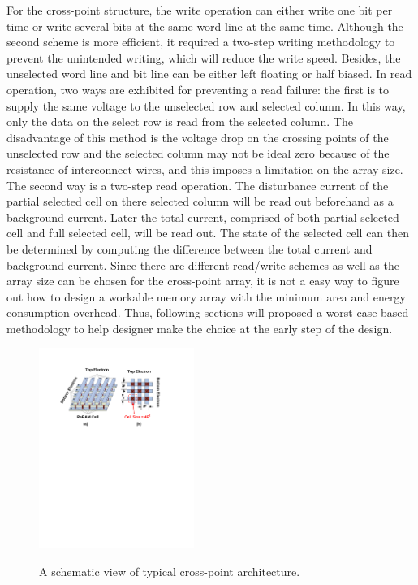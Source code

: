 For the cross-point structure, the write operation can either write one bit per time or write several bits at the same word line at the same time. Although the second scheme is more efficient, it required a two-step writing methodology to prevent the unintended writing, which will reduce the write speed. Besides, the unselected word line and bit line can be either left floating or half biased. In read operation, two ways are exhibited for preventing a read failure: the first is to supply the same voltage to the unselected row and selected column. In this way, only the data on the select row is read from the selected column. The disadvantage of this method is the voltage drop on the crossing points of the unselected row and the selected column may not be ideal zero because of the resistance of interconnect wires, and this imposes a limitation on the array size. The second way is a two-step read operation. The disturbance current of the partial selected cell on there selected column will be read out beforehand as a background current. Later the total current, comprised of both partial selected cell and full selected cell, will be read out. The state of the selected cell can then be determined by computing the difference between the total current and background current. Since there are different read/write schemes as well as the array size can be chosen for the cross-point array, it is not a easy way to figure out how to design a workable memory array with the minimum area and energy consumption overhead. Thus, following sections will proposed a worst case based methodology to help designer make the choice at the early step of the design.
\begin{figure}
\centering
  \includegraphics[width=0.45\textwidth]{./figures/crossbar_array2.pdf}\\
  \caption{A schematic view of typical cross-point architecture.}\label{fig:array}
\vspace{-10pt}
\end{figure}

